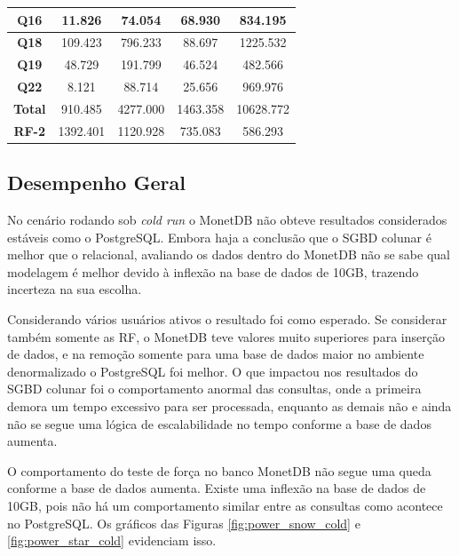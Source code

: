 \begin{table}[t]
\begin{tabular}{|c|c|c|c|c|}
        \textbf{Q16}   & 11.826                & 74.054                   & 68.930              & 834.195               \\ \hline
        \textbf{Q18}   & 109.423               & 796.233                  & 88.697              & 1225.532              \\ \hline
        \textbf{Q19}   & 48.729                & 191.799                  & 46.524              & 482.566               \\ \hline
        \textbf{Q22}   & 8.121                 & 88.714                   & 25.656              & 969.976               \\ \hline
        \textbf{Total} & 910.485               & 4277.000                 & 1463.358            & 10628.772             \\ \hline
        \textbf{RF-2}  & 1392.401              & 1120.928                 & 735.083             & 586.293               \\ \hline

\end{tabular}
\end{table}


\subsection{Desempenho Geral}

No cenário rodando sob \textit{cold run} o MonetDB não obteve resultados considerados estáveis como o PostgreSQL. Embora haja a conclusão que o SGBD colunar é melhor que o relacional, avaliando os dados dentro do MonetDB não se sabe qual modelagem é melhor devido à inflexão na base de dados de 10GB, trazendo incerteza na sua escolha. 

Considerando vários usuários ativos o resultado foi como esperado. Se considerar também somente as RF, o MonetDB teve valores muito superiores para inserção de dados, e na remoção somente para uma base de dados maior no ambiente denormalizado o PostgreSQL foi melhor. O que impactou nos resultados do SGBD colunar foi o comportamento anormal das consultas, onde a primeira demora um tempo excessivo para ser processada, enquanto as demais não e ainda não se segue uma lógica de escalabilidade no tempo conforme a base de dados aumenta.

O comportamento do teste de força no banco MonetDB não segue uma queda conforme a base de dados aumenta. Existe uma inflexão na base de dados de 10GB, pois não há um comportamento similar entre as consultas como acontece no PostgreSQL. Os gráficos das Figuras \ref{fig:power_snow_cold} e \ref{fig:power_star_cold} evidenciam isso. 

